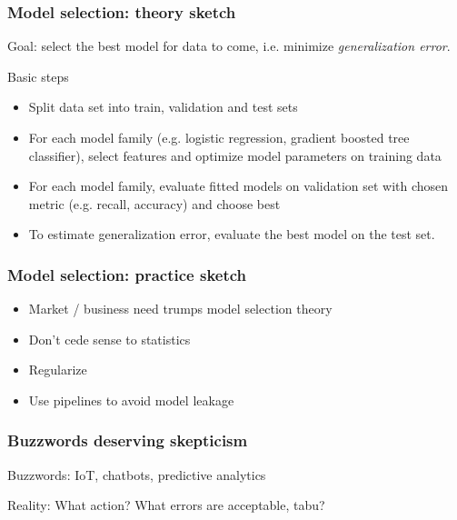 \begin{frame}
  \frametitle{Model selection: theory sketch}
  Goal: select the best model for data to come, i.e. minimize \emph{generalization error}.\newline

  Basic steps
  \begin{itemize}
    \item {\color{blue}Split data} set into train, validation and test sets
    \item For each model family (e.g. logistic regression, gradient boosted tree classifier), {\color{blue}select features} and {\color{blue}optimize model parameters} on training data
    \item For each model family, {\color{blue}evaluate fitted models} on validation set with chosen metric (e.g. recall, accuracy) and choose best
    \item To {\color{blue}estimate generalization error}, evaluate the best model on the test set.
  \end{itemize}
\end{frame}
\begin{frame}
  \frametitle{Model selection: practice sketch}

  \begin{itemize}
    \item Market / business need trumps model selection theory
    \item Don't cede sense to statistics
    \item Regularize
    \item Use pipelines to avoid model leakage
  \end{itemize}
\end{frame}
\begin{frame}
\frametitle{Buzzwords deserving skepticism}
Buzzwords: IoT, chatbots, predictive analytics

Reality: What action? What errors are acceptable, tabu?
\end{frame}




